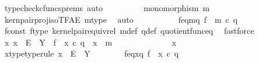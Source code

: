 \begin{isabellebody}
\ {\isacharparenleft}{\kern0pt}typecheck{\isacharunderscore}{\kern0pt}cfuncs{\isacharunderscore}{\kern0pt}prems{\isacharcomma}{\kern0pt}\ auto{\isacharparenright}{\kern0pt}\isanewline
\ \ \ \ \ \ \isamarkupfalse%
\ \isamarkupfalse%
\ {\isachardoublequoteopen}monomorphism\ m{\isachardoublequoteclose}\isanewline
\ \ \ \ \ \ \ \ \isamarkupfalse%
\ kern{\isacharunderscore}{\kern0pt}pair{\isacharunderscore}{\kern0pt}proj{\isacharunderscore}{\kern0pt}iso{\isacharunderscore}{\kern0pt}TFAE{}\ m{\isacharunderscore}{\kern0pt}type\ \isamarkupfalse%
\ auto\isanewline
\ \ \ \ \isamarkupfalse%
\isanewline
\isanewline
\ \ \ \ \isamarkupfalse%
\ f{\isacharunderscore}{\kern0pt}eq{\isacharunderscore}{\kern0pt}m{\isacharunderscore}{\kern0pt}q{\isacharcolon}{\kern0pt}\ {\isachardoublequoteopen}f\ {\isacharequal}{\kern0pt}\ m\ {\isasymcirc}\isactrlsub c\ q{\isachardoublequoteclose}\isanewline
\ \ \ \ \ \ \isamarkupfalse%
\ f{\isacharunderscore}{\kern0pt}const\ f{\isacharunderscore}{\kern0pt}type\ kernel{\isacharunderscore}{\kern0pt}pair{\isacharunderscore}{\kern0pt}equiv{\isacharunderscore}{\kern0pt}rel\ m{\isacharunderscore}{\kern0pt}def\ q{\isacharunderscore}{\kern0pt}def\ quotient{\isacharunderscore}{\kern0pt}func{\isacharunderscore}{\kern0pt}eq\ \isamarkupfalse%
\ fastforce\isanewline
\isanewline
\ \ \ \ \isamarkupfalse%
\ {\isachardoublequoteopen}{\isasymAnd}x{\isachardot}{\kern0pt}\ x\ {\isacharcolon}{\kern0pt}\ E\ {\isasymrightarrow}\ Y\ {\isasymLongrightarrow}\ f\ {\isacharequal}{\kern0pt}\ x\ {\isasymcirc}\isactrlsub c\ q\ {\isasymLongrightarrow}\ x\ {\isacharequal}{\kern0pt}\ m{\isachardoublequoteclose}\isanewline
\ \ \ \ \isamarkupfalse%
\ {\isacharminus}{\kern0pt}\isanewline
\ \ \ \ \ \ \isamarkupfalse%
\ x\isanewline
\ \ \ \ \ \ \isamarkupfalse%
\ x{\isacharunderscore}{\kern0pt}type{\isacharbrackleft}{\kern0pt}type{\isacharunderscore}{\kern0pt}rule{\isacharbrackright}{\kern0pt}{\isacharcolon}{\kern0pt}\ {\isachardoublequoteopen}x\ {\isacharcolon}{\kern0pt}\ E\ {\isasymrightarrow}\ Y{\isachardoublequoteclose}\isanewline
\ \ \ \ \ \ \isamarkupfalse%
\ f{\isacharunderscore}{\kern0pt}eq{\isacharunderscore}{\kern0pt}x{\isacharunderscore}{\kern0pt}q{\isacharcolon}{\kern0pt}\ {\isachardoublequoteopen}f\ {\isacharequal}{\kern0pt}\ x\ {\isasymcirc}\isactrlsub c\ q{\isachardoublequoteclose}\isanewline
\ \ \ \ \ \ \isamarkupfalse%

\end{isabellebody}
